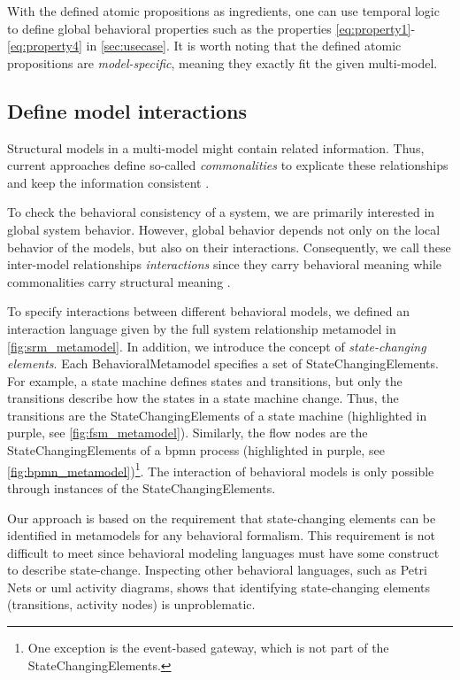 \documentclass{jot}
\begin{document}
With the defined atomic propositions as ingredients, one can use temporal logic to define global behavioral properties such as the properties \eqref{eq:property1}-\eqref{eq:property4} in \autoref{sec:usecase}.
It is worth noting that the defined atomic propositions are \textit{model-specific}, meaning they exactly fit the given multi-model.


\subsection{Define model interactions}
Structural models in a multi-model might contain related information.
Thus, current approaches define so-called \emph{commonalities} to explicate these relationships and keep the information consistent \cite{stunkelComprehensiveSystemsFormal2021,klareCommonalitiesPreservingConsistency2019}.

To check the behavioral consistency of a system, we are primarily interested in global system behavior.
However, global behavior depends not only on the local behavior of the models, but also on their interactions.
Consequently, we call these inter-model relationships \emph{interactions} since they carry behavioral meaning while commonalities carry structural meaning \cite{krauterBehavioralConsistencyHeterogeneous2021}.

To specify interactions between different behavioral models, we defined an interaction language given by the full system relationship metamodel in \cref{fig:srm_metamodel}.
In addition, we introduce the concept of \emph{state-changing elements}.
Each \textsf{BehavioralMetamodel} specifies a set of \textsf{StateChangingElement}s.
For example, a state machine defines states and transitions, but only the transitions describe how the states in a state machine change.
Thus, the transitions are the \textsf{StateChangingElement}s of a state machine (highlighted in purple, see \cref{fig:fsm_metamodel}).
Similarly, the flow nodes are the \textsf{StateChangingElement}s of a \gls*{bpmn} process (highlighted in purple, see \cref{fig:bpmn_metamodel})\footnote{One exception is the event-based gateway, which is not part of the \textsf{StateChangingElement}s.}.
The interaction of behavioral models is only possible through instances of the \textsf{StateChangingElement}s.

Our approach is based on the requirement that state-changing elements can be identified in metamodels for any behavioral formalism.
This requirement is not difficult to meet since behavioral modeling languages must have some construct to describe state-change.
Inspecting other behavioral languages, such as Petri Nets or \gls*{uml} activity diagrams, shows that identifying state-changing elements (transitions, activity nodes) is unproblematic. 
\end{document}

